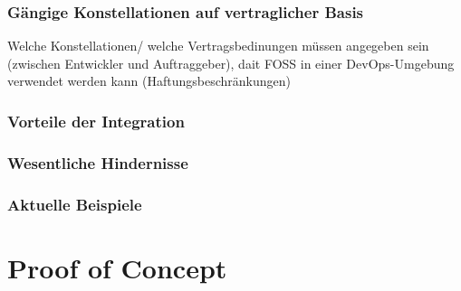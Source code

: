 \documentclass[12pt,titlepage]{article}
\begin{document}
\subsubsection{Gängige Konstellationen auf vertraglicher Basis}
Welche Konstellationen/ welche Vertragsbedinungen müssen angegeben sein (zwischen Entwickler und Auftraggeber), dait FOSS in einer DevOps-Umgebung verwendet werden kann (Haftungsbeschränkungen)
\subsubsection{Vorteile der Integration}
\subsubsection{Wesentliche Hindernisse}
\subsubsection{Aktuelle Beispiele}




\section{Proof of Concept}


\end{document}
